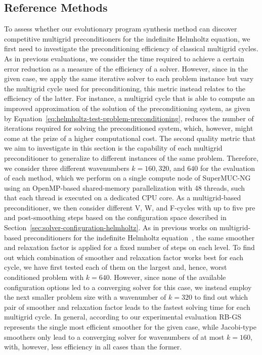 \subsection{Reference Methods}
To assess whether our evolutionary program synthesis method can discover competitive multigrid preconditioners for the indefinite Helmholtz equation, we first need to investigate the preconditioning efficiency of classical multigrid cycles.
As in previous evaluations, we consider the time required to achieve a certain error reduction as a measure of the efficiency of a solver.
However, since in the given case, we apply the same iterative solver to each problem instance but vary the multigrid cycle used for preconditioning, this metric instead relates to the efficiency of the latter.
For instance, a multigrid cycle that is able to compute an improved approximation of the solution of the preconditioning system, as given by Equation~\eqref{eq:helmholtz-test-problem-preconditioning}, reduces the number of iterations required for solving the preconditioned system, which, however, might come at the prize of a higher computational cost.
The second quality metric that we aim to investigate in this section is the capability of each multigrid preconditioner to generalize to different instances of the same problem.
Therefore, we consider three different wavenumbers $k = 160, 320$, and $640$ for the evaluation of each method, which we perform on a single compute node of SuperMUC-NG using an OpenMP-based shared-memory parallelization  with 48 threads, such that each thread is executed on a dedicated CPU core.
As a multigrid-based preconditioner, we then consider different V, W, and F-cycles with up to five pre and post-smoothing steps based on the configuration space described in Section~\ref{sec:solver-configuration-helmholtz}.
As in previous works on multigrid-based preconditioners for the indefinite Helmholtz equation~\cite{erlangga2006multigrid,erlangga2008advances,cocquet2017shift}, the same smoother and relaxation factor is applied for a fixed number of steps on each level.
To find out which combination of smoother and relaxation factor works best for each cycle, we have first tested each of them on the largest and, hence, worst conditioned problem with $k = 640$.
However, since none of the available configuration options led to a converging solver for this case, we instead employ the next smaller problem size with a wavenumber of $k = 320$ to find out which pair of smoother and relaxation factor leads to the fastest solving time for each multigrid cycle.
In general, according to our experimental evaluation RB-GS represents the single most efficient smoother for the given case, while Jacobi-type smoothers only lead to a converging solver for wavenumbers of at most $k = 160$, with, however, less efficiency in all cases than the former.
